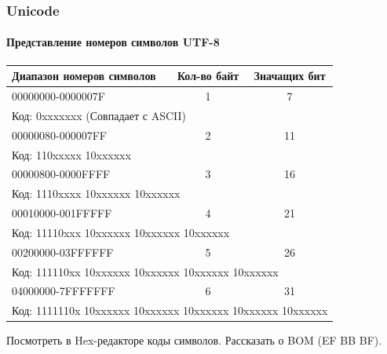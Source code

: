 \begin{frame}
    \frametitle{Unicode}
    \framesubtitle{Представление номеров символов UTF-8}
    
    \begin{center}
        \begin{tabular}{|l|c|c|}
        \hline\hline
        Диапазон номеров символов    
                          & Кол-во байт 
                              & Значащих бит                                            \\ \hline\hline
        00000000-0000007F & 1 & 7  \\ \hline 
            \multicolumn{3}{|l|}{Код: 0xxxxxxx (Совпадает с ASCII)                         } \\ \hline\hline
        00000080-000007FF & 2 & 11 \\ \hline 
            \multicolumn{3}{|l|}{Код: 110xxxxx 10xxxxxx                                    } \\ \hline\hline
        00000800-0000FFFF & 3 & 16 \\ \hline 
            \multicolumn{3}{|l|}{Код: 1110xxxx 10xxxxxx 10xxxxxx                           } \\ \hline\hline
        00010000-001FFFFF & 4 & 21 \\ \hline 
            \multicolumn{3}{|l|}{Код: 11110xxx 10xxxxxx 10xxxxxx 10xxxxxx                  } \\ \hline\hline
        00200000-03FFFFFF & 5 & 26 \\ \hline 
            \multicolumn{3}{|l|}{Код: 111110xx 10xxxxxx 10xxxxxx 10xxxxxx 10xxxxxx         } \\ \hline\hline
        04000000-7FFFFFFF & 6 & 31 \\ \hline 
            \multicolumn{3}{|l|}{Код: 1111110x 10xxxxxx 10xxxxxx 10xxxxxx 10xxxxxx 10xxxxxx} \\ \hline
        \end{tabular}
    \end{center}
\end{frame}

Посмотреть в Hex-редакторе коды символов. Рассказать о BOM (EF BB BF).

